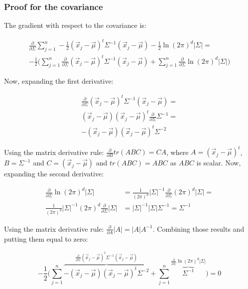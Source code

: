 		\subsubsection{Proof for the covariance}
		The gradient with respect to the covariance is:

		\begin{align*}
			\frac{\partial}{\partial\Sigma} \sum\limits_{j=1}^n-\frac{1}{2}(\vec{x}_j-\vec{\mu})^t\Sigma^{-1}(\vec{x}_j-\vec{\mu})-\frac{1}{2}\ln(2\pi)^d|\Sigma|=\\
			-\frac{1}{2}\biggl(\sum\limits_{j=1}^n\frac{\partial}{\partial\Sigma}(\vec{x}_j-\vec{\mu})^t\Sigma^{-1}(\vec{x}_j-\vec{\mu})+\sum\limits_{j=1}^n\frac{\partial}{\partial\Sigma}\ln(2\pi)^d|\Sigma|\biggr)
		\end{align*}

		Now, expanding the first derivative:

		\begin{align*}
			\frac{\partial}{\partial\Sigma}(\vec{x}_j-\vec{\mu})^t\Sigma^{-1}(\vec{x}_j-\vec{\mu}) =\\
			(\vec{x}_j-\vec{\mu})(\vec{x}_j-\vec{\mu})^t\frac{\partial}{\partial\Sigma}\Sigma^{-1} =\\
			-(\vec{x}_j-\vec{\mu})(\vec{x}_j-\vec{\mu})^t\Sigma^{-2}
		\end{align*}

		Using the matrix derivative rule: $\frac{\partial}{\partial B} tr(ABC) = CA$, where $A=(\vec{x}_j-\vec{\mu})^t$, $B = \Sigma^{-1}$ and $C=(\vec{x}_j-\vec{\mu})$ and $tr(ABC) = ABC$ as $ABC$ is scalar.
                Now, expanding the second derivative:

                \begin{align*}
                  \frac{\partial}{\partial\Sigma}\ln(2\pi)^d|\Sigma| &=\frac{1}{(2\pi)^d}|\Sigma|^{-1}\frac{\partial}{\partial\Sigma}(2\pi)^d|\Sigma|=\\
                    \frac{1}{(2\pi)^d}|\Sigma|^{-1}(2\pi)^d\frac{\partial}{\partial\Sigma}|\Sigma| &=|\Sigma|^{-1}|\Sigma|\Sigma^{-1} = \Sigma^{-1}
                \end{align*}

                Using the matrix derivative rule: $\frac{\partial}{\partial A} |A| = |A|A^{-1}$.
                Combining those results and putting them equal to zero:

                $$-\frac{1}{2}\biggl(\sum\limits_{j=1}^n\overbrace{-(\vec{x}_j-\vec{\mu})(\vec{x}_j-\vec{\mu})^t\Sigma^{-2}}^{\frac{\partial}{\partial\Sigma}(\vec{x}_j-\vec{\mu})^t\Sigma^{-1}(\vec{x}_j-\vec{\mu})}+\sum\limits_{j=1}^n\overbrace{\Sigma^{-1}}^{\frac{\partial}{\partial\Sigma}\ln(2\pi)^d|\Sigma|}\biggr)=0$$

